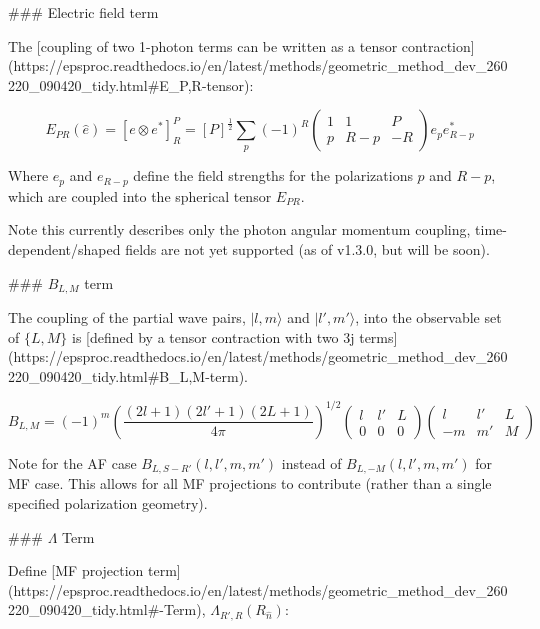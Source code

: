 {### Electric field term

The [coupling of two 1-photon terms can be written as a tensor contraction](https://epsproc.readthedocs.io/en/latest/methods/geometric_method_dev_260220_090420_tidy.html#E_{P,R}-tensor):

\begin{equation}
E_{PR}(\hat{e})=[e\otimes e^{*}]_{R}^{P}=[P]^{\frac{1}{2}}\sum_{p}(-1)^{R}\left(\begin{array}{ccc}
1 & 1 & P\\
p & R-p & -R
\end{array}\right)e_{p}e_{R-p}^{*}\label{eq:EPR-defn-1}
\end{equation}

Where $e_{p}$ and $e_{R-p}$ define the field strengths for the polarizations $p$ and $R-p$, which are coupled into the spherical tensor $E_{PR}$.

Note this currently describes only the photon angular momentum coupling, time-dependent/shaped fields are not yet supported (as of v1.3.0, but will be soon).


### $B_{L,M}$ term

The coupling of the partial wave pairs, $|l,m\rangle$ and $|l',m'\rangle$, into the observable set of $\{L,M\}$ is [defined by a tensor contraction with two 3j terms](https://epsproc.readthedocs.io/en/latest/methods/geometric_method_dev_260220_090420_tidy.html#B_{L,M}-term).

\begin{equation}
B_{L,M}=(-1)^{m}\left(\frac{(2l+1)(2l'+1)(2L+1)}{4\pi}\right)^{1/2}\left(\begin{array}{ccc}
l & l' & L\\
0 & 0 & 0
\end{array}\right)\left(\begin{array}{ccc}
l & l' & L\\
-m & m' & M
\end{array}\right)
\end{equation}

Note for the AF case $B_{L,S-R'}(l,l',m,m')$ instead of $B_{L,-M}(l,l',m,m')$ for MF case. This allows for all MF projections to contribute (rather than a single specified polarization geometry).


### $\Lambda$ Term

Define [MF projection term](https://epsproc.readthedocs.io/en/latest/methods/geometric_method_dev_260220_090420_tidy.html#\Lambda-Term), $\Lambda_{R',R}(R_{\hat{n}})$:

}
